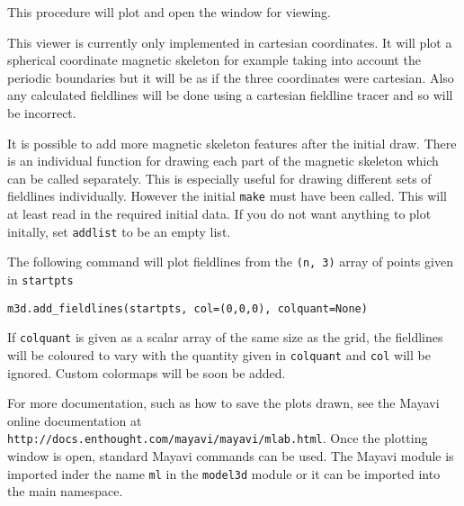 \documentclass[12pt]{article}
\begin{document}
      This procedure will plot and open the window for viewing.

      This viewer is currently only implemented in cartesian coordinates. It will plot a spherical coordinate magnetic skeleton for example taking into account the periodic boundaries but it will be as if the three coordinates were cartesian. Also any calculated fieldlines will be done using a cartesian fieldline tracer and so will be incorrect.

      It is possible to add more magnetic skeleton features after the initial draw. There is an individual function for drawing each part of the magnetic skeleton which can be called separately. This is especially useful for drawing different sets of fieldlines individually. However the initial \texttt{make} must have been called. This will at least read in the required initial data. If you do not want anything to plot initally, set \texttt{addlist} to be an empty list.

      The following command will plot fieldlines from the \texttt{(n, 3)} array of points given in \texttt{startpts}
      
      \texttt{m3d.add\_fieldlines(startpts, col=(0,0,0), colquant=None)}

      If \texttt{colquant} is given as a scalar array of the same size as the grid, the fieldlines will be coloured to vary with the quantity given in \texttt{colquant} and \texttt{col} will be ignored. Custom colormaps will be soon be added.

      For more documentation, such as how to save the plots drawn, see the Mayavi online documentation at \texttt{http://docs.enthought.com/mayavi/mayavi/mlab.html}. Once the plotting window is open, standard Mayavi commands can be used. The Mayavi module is imported inder the name \texttt{ml} in the \texttt{model3d} module or it can be imported into the main namespace.

  \printbibliography
\end{document}
